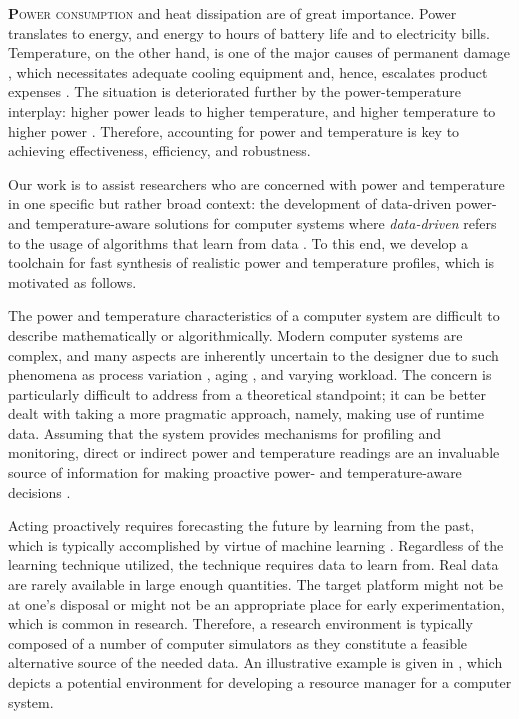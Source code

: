 \lettrine[findent=0.3em, nindent=0em]{\textbf{P}}{ower consumption} and heat
dissipation are of great importance. Power translates to energy, and energy to
hours of battery life and to electricity bills. Temperature, on the other hand,
is one of the major causes of permanent damage \cite{jedec}, which necessitates
adequate cooling equipment and, hence, escalates product expenses
\cite{chaudhry2015}. The situation is deteriorated further by the
power-temperature interplay: higher power leads to higher temperature, and
higher temperature to higher power \cite{liu2007}. Therefore, accounting for
power and temperature is key to achieving effectiveness, efficiency, and
robustness.

Our work is to assist researchers who are concerned with power and temperature
in one specific but rather broad context: the development of data-driven power-
and temperature-aware solutions for computer systems where \emph{data-driven}
refers to the usage of algorithms that learn from data \cite{bishop2006}. To
this end, we develop a toolchain for fast synthesis of realistic power and
temperature profiles, which is motivated as follows.

The power and temperature characteristics of a computer system are difficult to
describe mathematically or algorithmically. Modern computer systems are complex,
and many aspects are inherently uncertain to the designer due to such phenomena
as process variation \cite{chandrakasan2000}, aging \cite{coskun2006}, and
varying workload. The concern is particularly difficult to address from a
theoretical standpoint; it can be better dealt with taking a more pragmatic
approach, namely, making use of runtime data. Assuming that the system provides
mechanisms for profiling and monitoring, direct or indirect power and
temperature readings are an invaluable source of information for making
proactive power- and temperature-aware decisions \cite{chaudhry2015,
coskun2008}.


Acting proactively requires forecasting the future by learning from the past,
which is typically accomplished by virtue of machine learning \cite{bishop2006}.
Regardless of the learning technique utilized, the technique requires data to
learn from. Real data are rarely available in large enough quantities. The
target platform might not be at one's disposal or might not be an appropriate
place for early experimentation, which is common in research. Therefore, a
research environment is typically composed of a number of computer simulators as
they constitute a feasible alternative source of the needed data. An
illustrative example is given in , which depicts a potential
environment for developing a resource manager for a computer system.


